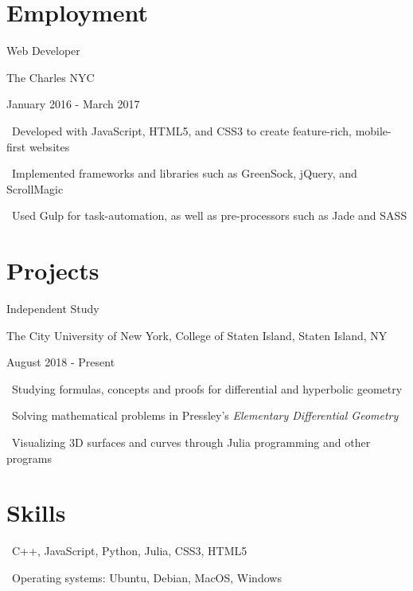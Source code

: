 \documentclass[letterpaper]{article}
\renewenvironment{itemize}{
  \begin{list}{}{
    \setlength{\leftmargin}{1.5em}
  }
}{
  \end{list}
}
\begin{document}
\section*{Employment}

\begin{itemize}
\item Web Developer

The Charles NYC

January 2016 - March 2017
  \begin{itemize}
    \item \textperiodcentered \ Developed with JavaScript, HTML5, and CSS3 to create feature-rich, mobile-first websites
    \item \textperiodcentered \ Implemented frameworks and libraries such as GreenSock, jQuery, and ScrollMagic
    \item \textperiodcentered \ Used Gulp for task-automation, as well as pre-processors such as Jade and SASS
  \end{itemize}
\end{itemize}

\section*{Projects}

\begin{itemize}
  \item Independent Study
  
  The City University of New York, College of Staten Island, Staten Island, NY
  
  August 2018 - Present

  \begin{itemize}
    \item \textperiodcentered \ Studying formulas, concepts and proofs for differential and hyperbolic geometry
    \item \textperiodcentered \ Solving mathematical problems in Pressley's \emph{Elementary Differential Geometry}
    \item \textperiodcentered \ Visualizing 3D surfaces and curves through Julia programming and other programs
  \end{itemize}
\end{itemize}

\section*{Skills}
\begin{itemize}
  \item \textperiodcentered \ C++, JavaScript, Python, Julia, CSS3, HTML5
  \item \textperiodcentered \ Operating systems: Ubuntu, Debian, MacOS, Windows
\end{itemize}

\bigskip
\end{document}
